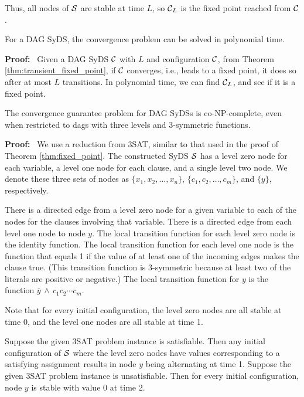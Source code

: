Thus, all nodes of $\mbox{$\mathcal{S}$}$ are stable at time $L$,
so  $\mbox{$\mathcal{C}$}_L$ is the fixed point reached from $\mbox{$\mathcal{C}$}$.
\QED

\iffalse

\begin{corollary}\label{cor:convergence}
For a DAG SyDS, the convergence problem can be solved in polynomial time.
\end{corollary}
\noindent
\textbf{Proof:}~ Given a DAG SyDS $\mbox{$\mathcal{C}$}$ with $L$ and configuration $\mbox{$\mathcal{C}$}$,
from Theorem \ref{thm:transient_fixed_point},
if $\mbox{$\mathcal{C}$}$ converges, i.e., leads to a fixed point,
it does so after at most $L$ transitions.
In polynomial time, we can find $\mbox{$\mathcal{C}$}_L$, and see if it is a fixed point.
\QED

\begin{theorem}\label{thm:convergence_guaranee}
The convergence guarantee problem for DAG SyDSs is co-NP-complete,
even when restricted to dags with  three levels and 3-symmetric functions.
\end{theorem}
\noindent
\textbf{Proof:}~ 
We use a reduction from 3SAT, similar to that used in the proof of Theorem \ref{thm:fixed_point}.
The constructed SyDS $\mbox{$\mathcal{S}$}$ has a level zero node for each variable, 
a level one node for each clause, and a single level two node.
We denote these three sets of nodes as $\{x_1, x_2, \ldots , x_n\}$,
$\{c_1,c_2, \ldots , c_m\}$, and $\{y\}$, respectively.

There is a directed edge from a  level zero node for a given variable 
to each of  the nodes for the clauses involving that variable.
There is a directed edge from each level one node to node $y$.
The local transition function for each level zero node is the identity function.
The local transition function for each level one node is the function that equals 1
 if the value of at least one of the incoming edges
makes the clause true. 
(This transition function is 3-symmetric because at least two of the literals are positive or negative.)
The local transition function for $y$ is the function $\bar{y} \, \wedge \, c_1 c_2 \cdots  c_{m}$.

Note that for every initial configuration, the level zero nodes are all stable at time 0,
and the level one nodes are all stable at time 1.

\smallskip
Suppose the given 3SAT problem instance is satisfiable.
Then any initial configuration of $\mbox{$\mathcal{S}$}$ where the level zero nodes 
have values corresponding to a satisfying assignment
results in node $y$ being alternating at time 1.
Suppose the given 3SAT problem instance is unsatisfiable.
Then for every initial configuration, node $y$ is stable with value 0 at time 2.

